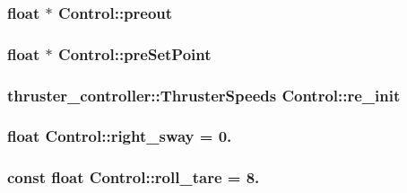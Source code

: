 \subsubsection[{\texorpdfstring{preout}{preout}}]{\setlength{\rightskip}{0pt plus 5cm}float $\ast$ Control\+::preout\hspace{0.3cm}{\ttfamily [private]}}\hypertarget{classControl_a68319ff62b7b0a0f2034e6daf6a79aa3}{}\label{classControl_a68319ff62b7b0a0f2034e6daf6a79aa3}
\subsubsection[{\texorpdfstring{pre\+Set\+Point}{preSetPoint}}]{\setlength{\rightskip}{0pt plus 5cm}float $\ast$ Control\+::pre\+Set\+Point\hspace{0.3cm}{\ttfamily [private]}}\hypertarget{classControl_a94f3484d88729c31dfd74b983f7fab0d}{}\label{classControl_a94f3484d88729c31dfd74b983f7fab0d}
\subsubsection[{\texorpdfstring{re\+\_\+init}{re_init}}]{\setlength{\rightskip}{0pt plus 5cm}thruster\+\_\+controller\+::\+Thruster\+Speeds Control\+::re\+\_\+init\hspace{0.3cm}{\ttfamily [private]}}\hypertarget{classControl_a575ab1b3c33d659078391792285040d9}{}\label{classControl_a575ab1b3c33d659078391792285040d9}
\subsubsection[{\texorpdfstring{right\+\_\+sway}{right_sway}}]{\setlength{\rightskip}{0pt plus 5cm}float Control\+::right\+\_\+sway = 0.\hspace{0.3cm}{\ttfamily [private]}}\hypertarget{classControl_a944fd0cb50f0ba016a91fac4d6211a4b}{}\label{classControl_a944fd0cb50f0ba016a91fac4d6211a4b}
\subsubsection[{\texorpdfstring{roll\+\_\+tare}{roll_tare}}]{\setlength{\rightskip}{0pt plus 5cm}const float Control\+::roll\+\_\+tare = 8.\hspace{0.3cm}{\ttfamily [private]}}\hypertarget{classControl_ae5285f73379bd5cbc060d99983de2c82}{}\label{classControl_ae5285f73379bd5cbc060d99983de2c82}
